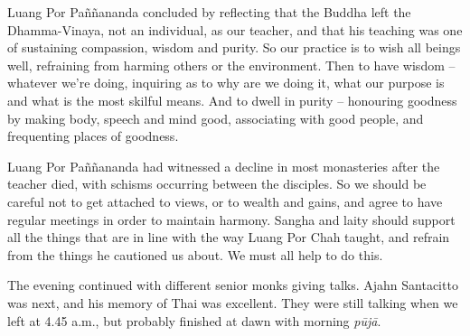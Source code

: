 Luang Por Paññananda concluded by reflecting that the Buddha left the
Dhamma-Vinaya, not an individual, as our teacher, and that his teaching
was one of sustaining compassion, wisdom and purity. So our practice is
to wish all beings well, refraining from harming others or the
environment. Then to have wisdom -- whatever we're doing, inquiring as
to why are we doing it, what our purpose is and what is the most skilful
means. And to dwell in purity -- honouring goodness by making body, 
speech and mind good, associating with good people, and frequenting
places of goodness. 

Luang Por Paññananda had witnessed a decline in most monasteries after
the teacher died, with schisms occurring between the disciples. So we
should be careful not to get attached to views, or to wealth and gains, 
and agree to have regular meetings in order to maintain harmony. Sangha
and laity should support all the things that are in line with the way
Luang Por Chah taught, and refrain from the things he cautioned us
about. We must all help to do this. 

The evening continued with different senior monks giving talks. Ajahn
Santacitto was next, and his memory of Thai was excellent. They were
still talking when we left at 4.45 a.m., but probably finished at dawn
with morning \emph{pūjā}. 

